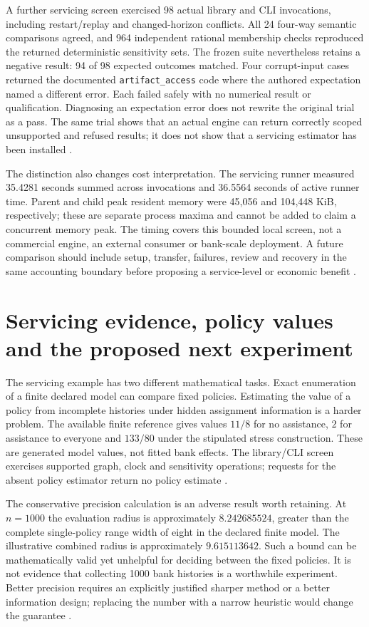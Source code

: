 A further servicing screen exercised 98 actual library and CLI invocations,
including restart/replay and changed-horizon conflicts. All 24 four-way semantic
comparisons agreed, and 964 independent rational membership checks reproduced
the returned deterministic sensitivity sets. The frozen suite nevertheless
retains a negative result: 94 of 98 expected outcomes matched. Four corrupt-input
cases returned the documented \texttt{artifact\_access} code where the authored
expectation named a different error. Each failed safely with no numerical
result or qualification. Diagnosing an expectation error does not rewrite the
original trial as a pass. The same trial shows that an actual engine can return
correctly scoped unsupported and refused results; it does not show that a
servicing estimator has been installed \citep{exec14_servicing_evidence}.

The distinction also changes cost interpretation. The servicing runner measured
35.4281 seconds summed across invocations and 36.5564 seconds of active runner
time. Parent and child peak resident memory were 45,056 and 104,448 KiB,
respectively; these are separate process maxima and cannot be added to claim a
concurrent memory peak. The timing covers this bounded local screen, not a
commercial engine, an external consumer or bank-scale deployment. A future
comparison should include setup, transfer, failures, review and recovery in the
same accounting boundary before proposing a service-level or economic benefit
\citep{exec14_servicing_evidence}.

\section{Servicing evidence, policy values and the proposed next experiment}
\label{exec14:servicing-evidence}

The servicing example has two different mathematical tasks. Exact enumeration
of a finite declared model can compare fixed policies. Estimating the value of
a policy from incomplete histories under hidden assignment information is a
harder problem. The available finite reference gives values $11/8$ for no
assistance, $2$ for assistance to everyone and $133/80$ under the stipulated
stress construction. These are generated model values, not fitted bank effects.
The library/CLI screen exercises supported graph, clock and sensitivity
operations; requests for the absent policy estimator return no policy estimate
\citep{exec14_servicing_evidence}.

The conservative precision calculation is an adverse result worth retaining.
At $n=1000$ the evaluation radius is approximately $8.242685524$, greater than
the complete single-policy range width of eight in the declared finite model.
The illustrative combined radius is approximately $9.615113642$. Such a bound
can be mathematically valid yet unhelpful for deciding between the fixed
policies. It is not evidence that collecting 1000 bank histories is a worthwhile
experiment. Better precision requires an explicitly justified sharper method
or a better information design; replacing the number with a narrow heuristic
would change the guarantee \citep{exec14_servicing_evidence}.

